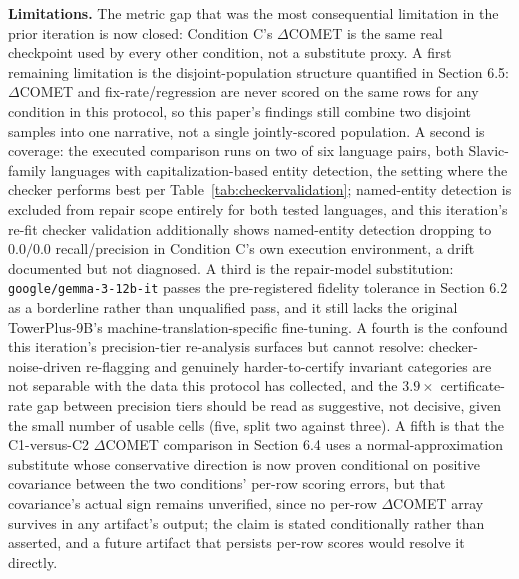 \documentclass[11pt,letterpaper]{article}
\begin{document}
\textbf{Limitations.} The metric gap that was the most consequential limitation in the prior iteration is now closed: Condition C's $\Delta$COMET is the same real checkpoint used by every other condition, not a substitute proxy. A first remaining limitation is the disjoint-population structure quantified in Section 6.5: $\Delta$COMET and fix-rate/regression are never scored on the same rows for any condition in this protocol, so this paper's findings still combine two disjoint samples into one narrative, not a single jointly-scored population. A second is coverage: the executed comparison runs on two of six language pairs, both Slavic-family languages with capitalization-based entity detection, the setting where the checker performs best per Table~\ref{tab:checkervalidation}; named-entity detection is excluded from repair scope entirely for both tested languages, and this iteration's re-fit checker validation additionally shows named-entity detection dropping to $0.0/0.0$ recall/precision in Condition C's own execution environment, a drift documented but not diagnosed. A third is the repair-model substitution: \texttt{google/gemma-3-12b-it} passes the pre-registered fidelity tolerance in Section 6.2 as a borderline rather than unqualified pass, and it still lacks the original TowerPlus-9B's machine-translation-specific fine-tuning. A fourth is the confound this iteration's precision-tier re-analysis surfaces but cannot resolve: checker-noise-driven re-flagging and genuinely harder-to-certify invariant categories are not separable with the data this protocol has collected, and the $3.9\times$ certificate-rate gap between precision tiers should be read as suggestive, not decisive, given the small number of usable cells (five, split two against three). A fifth is that the C1-versus-C2 $\Delta$COMET comparison in Section 6.4 uses a normal-approximation substitute whose conservative direction is now proven conditional on positive covariance between the two conditions' per-row scoring errors, but that covariance's actual sign remains unverified, since no per-row $\Delta$COMET array survives in any artifact's output; the claim is stated conditionally rather than asserted, and a future artifact that persists per-row scores would resolve it directly.
\end{document}
